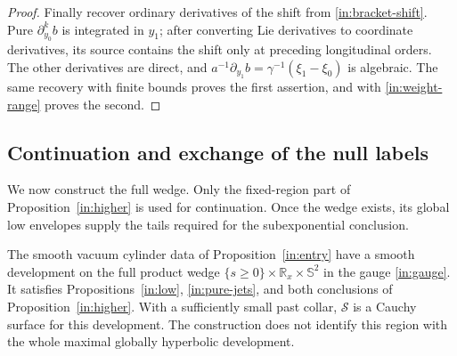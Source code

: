 \begin{proof}
Finally recover ordinary derivatives of the shift from
\eqref{in:bracket-shift}. Pure $\partial_{y_0}^k b$ is integrated
in $y_1$; after converting Lie derivatives to coordinate derivatives,
its source contains the shift only at preceding longitudinal orders.
The other derivatives are direct, and
$a^{-1}\partial_{y_1}b=\gamma^{-1}(\xi_1-\xi_0)$ is algebraic.
The same recovery with finite bounds proves the first assertion, and
with \eqref{in:weight-range} proves the second.
\end{proof}

\subsection{Continuation and exchange of the null labels}

We now construct the full wedge. Only the fixed-region part of
Proposition~\ref{in:higher} is used for continuation. Once the wedge
exists, its global low envelopes supply the tails required for the
subexponential conclusion.

\begin{proposition}
\label{in:continuation}
The smooth vacuum cylinder data of Proposition~\ref{in:entry} have
a smooth development on the full product wedge
$\{s\ge0\}\times\mathbb R_x\times\mathbb S^2$ in the gauge
\eqref{in:gauge}. It satisfies Propositions~\ref{in:low},
\ref{in:pure-jets}, and both conclusions of
Proposition~\ref{in:higher}. With a sufficiently small past collar,
$\mathcal S$ is a Cauchy surface for this development. The construction
does not identify this region with the whole maximal globally
hyperbolic development.
\end{proposition}

